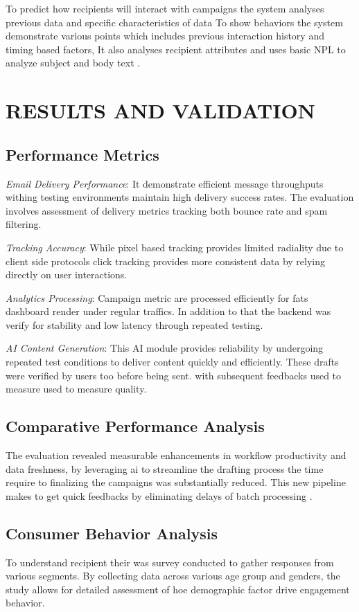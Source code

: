 \documentclass[12pt,journal,compsoc]{IEEEtran}
\begin{document}
To predict how recipients will interact with campaigns the system analyses previous data and specific characteristics of data To show behaviors the system demonstrate various points which includes previous interaction history and timing based factors, It also analyses recipient attributes and uses basic NPL to analyze subject and body text \cite{ref9,ref10}.

\section{RESULTS AND VALIDATION}

\subsection{Performance Metrics}

\textit{Email Delivery Performance}: It demonstrate efficient message throughputs withing testing environments maintain high delivery success rates. The evaluation involves assessment of delivery metrics tracking both bounce rate and spam filtering.

\textit{Tracking Accuracy}: While pixel based tracking provides limited radiality due to client side protocols click tracking provides more consistent data by relying directly on user interactions.

\textit{Analytics Processing}: Campaign metric are processed efficiently for fats dashboard render under regular traffics. In addition to that the backend was verify for stability and low latency through repeated testing.

\textit{AI Content Generation}: This AI module provides reliability by undergoing repeated test conditions to deliver content quickly and efficiently. These drafts were verified by users too before being sent. with subsequent feedbacks used to measure used to measure quality.

\subsection{Comparative Performance Analysis}
The evaluation revealed measurable enhancements in workflow productivity and data freshness, by leveraging ai to streamline the drafting process the time require to finalizing the campaigns was substantially reduced. This new pipeline makes to get quick feedbacks by eliminating delays of batch processing \cite{ref1,ref19}.

\subsection{Consumer Behavior Analysis}
To understand recipient their was survey conducted to gather responses from various segments. By collecting data across various age group and genders, the study allows for detailed assessment of hoe demographic factor drive engagement behavior.
\end{document}
